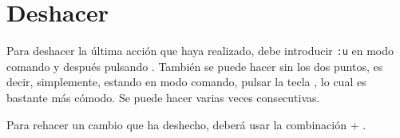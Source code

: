 \section{Deshacer}\label{sec:vim-deshacer}
Para deshacer la última acción que haya realizado, debe introducir \lstinline!:u! en modo comando y después
pulsando . También se puede hacer sin los dos puntos, es decir, simplemente, estando en modo
comando, pulsar la tecla , lo cual es bastante más cómodo. Se puede hacer varias veces consecutivas.

Para rehacer un cambio que ha deshecho, deberá usar la combinación  + .

